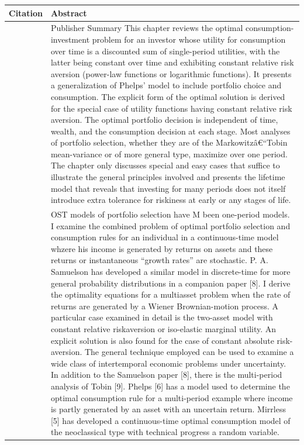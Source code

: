 \documentclass{article}
\begin{document}
\bigskip\noindent
\begin{tabular}{p{}p{}}
\toprule
Citation & Abstract \\
\hline
\cite{Samuelson_1975} & Publisher Summary   This chapter reviews the optimal consumption-investment problem for an investor whose utility for consumption over time is a discounted sum of single-period utilities, with the latter being constant over time and exhibiting constant relative risk aversion (power-law functions or logarithmic functions). It presents a generalization of Phelps' model to include portfolio choice and consumption. The explicit form of the optimal solution is derived for the special case of utility functions having constant relative risk aversion. The optimal portfolio decision is independent of time, wealth, and the consumption decision at each stage. Most analyses of portfolio selection, whether they are of the Markowitzâ€``Tobin mean-variance or of more general type, maximize over one period. The chapter only discusses special and easy cases that suffice to illustrate the general principles involved and presents the lifetime model that reveals that investing for many periods does not itself introduce extra tolerance for riskiness at early or any stages of life. \\
\cite{Merton_1969} & OST models of portfolio selection have M been one-period models. I examine the combined problem of optimal portfolio selection and consumption rules for an individual in a continuous-time model whzere his income is generated by returns on assets and these returns or instantaneous ``growth rates'' are stochastic. P. A. Samuelson has developed a similar model in discrete-time for more general probability distributions in a companion paper [8]. I derive the optimality equations for a multiasset problem when the rate of returns are generated by a Wiener Brownian-motion process. A particular case examined in detail is the two-asset model with constant relative riskaversion or iso-elastic marginal utility. An explicit solution is also found for the case of constant absolute risk-aversion. The general technique employed can be used to examine a wide class of intertemporal economic problems under uncertainty. In addition to the Samuelson paper [8], there is the multi-period analysis of Tobin [9]. Phelps [6] has a model used to determine the optimal consumption rule for a multi-period example where income is partly generated by an asset with an uncertain return. Mirrless [5] has developed a continuous-time optimal consumption model of the neoclassical type with technical progress a random variable. \\

\end{tabular}
\end{document}
